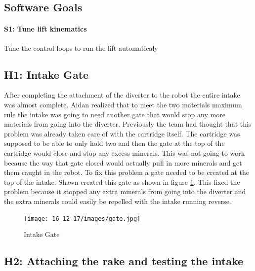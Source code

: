 \documentclass{article}
\begin{document}
\subsection{Software Goals}
\paragraph{S1: Tune lift kinematics}
Tune the control loops to run the lift automaticaly
\newpage
\subsection{H1: Intake Gate}

After completing the attachment of the diverter to the robot the entire intake was almost complete. Aidan realized that to meet the two materials maximum rule the intake was going to need another gate that would stop any more materials from going into the diverter. Previously the team had thought that this problem was already taken care of with the cartridge itself. The cartridge was supposed to be able to only hold two and then the gate at the top of the cartridge would close and stop any excess minerals. This was not going to work because the way that gate closed would actually pull in more minerals and get them caught in the robot. To fix this problem a gate needed to be created at the top of the intake. Shawn created this gate as shown in figure \ref{fig:gate}. This fixed the problem because it stopped any extra minerals from going into the diverter and the extra minerals could easily be repelled with the intake running reverse.

\begin{figure}
    \centering
    \texttt{[image: 16\_12-17/images/gate.jpg]}
    \caption{Intake Gate}
    \label{fig:gate}
\end{figure}

\subsection{H2: Attaching the rake and testing the intake}
\end{document}
